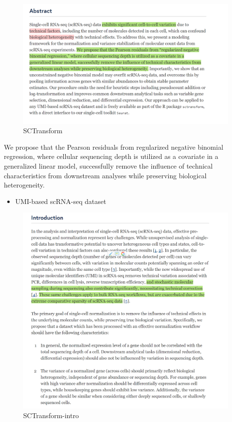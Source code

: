 \documentclass[
]{book}
\providecommand{\tightlist}{%
  \setlength{\itemsep}{0pt}\setlength{\parskip}{0pt}}
\begin{document}
\begin{figure}
\centering
\includegraphics{./figs/RNAseqCounts/sctransform.png}
\caption{SCTransform}
\end{figure}

We propose that the Pearson residuals from regularized negative binomial regression, where cellular sequencing depth is utilized as a covariate in a generalized linear model, successfully remove the influence of technical characteristics from downstream analyses while preserving biological heterogeneity.

\begin{itemize}
\tightlist
\item
  UMI-based scRNA-seq dataset
\end{itemize}

\begin{figure}
\centering
\includegraphics{./figs/RNAseqCounts/sctransform-intro.png}
\caption{SCTransform-intro}
\end{figure}
\end{document}
